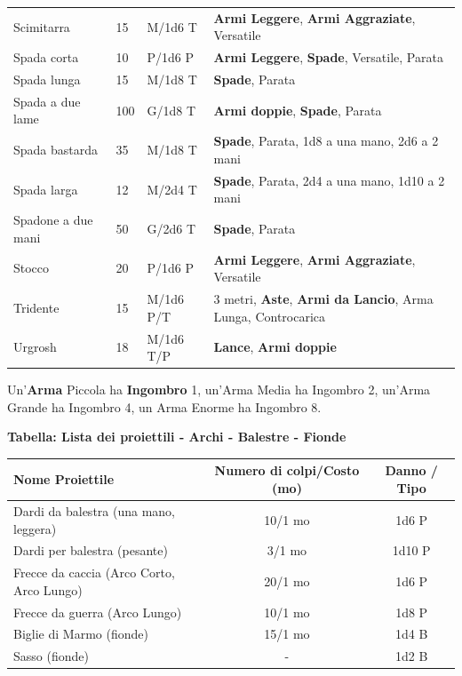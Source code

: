 \begin{xltabular}{\linewidth}{lllX}
Scimitarra& 15 & M/1d6 T&\textbf{Armi Leggere}, \textbf{Armi Aggraziate}, Versatile\\
Spada corta& 10 & P/1d6 P&\textbf{Armi Leggere}, \textbf{Spade}, Versatile, Parata\\
Spada lunga& 15 & M/1d8 T&\textbf{Spade}, Parata\\
Spada a due lame& 100& G/1d8 T& \textbf{Armi doppie}, \textbf{Spade}, Parata\\
Spada bastarda& 35 & M/1d8 T&\textbf{Spade}, Parata, 1d8 a una mano, 2d6 a 2 mani\\
Spada larga& 12 & M/2d4 T&\textbf{Spade}, Parata, 2d4 a una mano, 1d10 a 2 mani\\
Spadone a due mani& 50 & G/2d6 T&\textbf{Spade}, Parata\\
Stocco& 20 & P/1d6 P& \textbf{Armi Leggere}, \textbf{Armi Aggraziate}, Versatile\\
Tridente& 15 & M/1d6 P/T& 3 metri, \textbf{Aste}, \textbf{Armi da Lancio}, Arma Lunga, Controcarica\\
Urgrosh& 18 & M/1d6 T/P& \textbf{Lance}, \textbf{Armi doppie}\\
\end{xltabular}

\medskip

Un'\textbf{Arma} Piccola ha \textbf{Ingombro} 1, un'Arma Media ha Ingombro 2, un'Arma Grande ha Ingombro 4, un Arma Enorme ha Ingombro 8.

\medskip

\textbf{Tabella: Lista dei proiettili - Archi - Balestre - Fionde}\label{proiettili}

\noindent\begin{tabularx}{1\linewidth}{Xcc}
	\toprule
\rowcolor{gray!20}\textbf{Nome Proiettile}& \textbf{Numero di colpi/Costo (mo)} & \textbf{Danno / Tipo}\\
\toprule
Dardi da balestra (una mano, leggera) & 10/1 mo & 1d6 P\\
\rowcolor{gray!20}Dardi per balestra (pesante) & 3/1 mo & 1d10 P\\
Frecce da caccia (Arco Corto, Arco Lungo)& 20/1 mo & 1d6 P\\
\rowcolor{gray!20}Frecce da guerra (Arco Lungo)& 10/1 mo & 1d8 P\\
Biglie di Marmo (fionde)& 15/1 mo & 1d4 B\\
\rowcolor{gray!20}Sasso (fionde)& -& 1d2 B
\end{tabularx}

